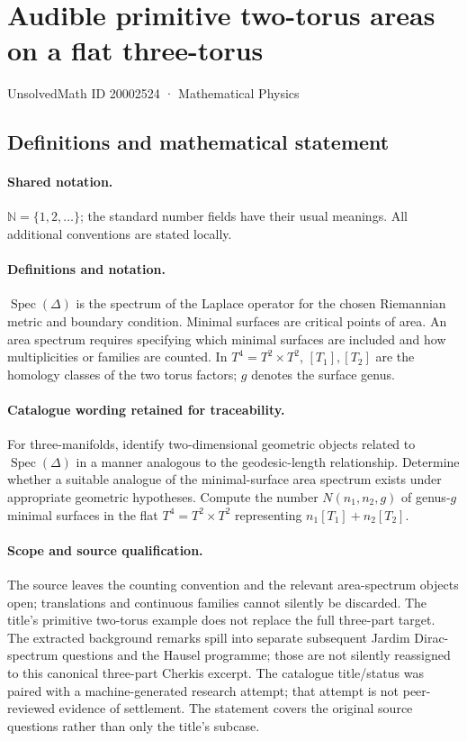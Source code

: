 \documentclass[11pt]{article}
\begin{document}
\setcounter{section}{20002523}
\section{Audible primitive two-torus areas on a flat three-torus}\label{20002524}
{\small UnsolvedMath ID 20002524 · Mathematical Physics}
\subsection{Definitions and mathematical statement}

\paragraph{Shared notation.}$\mathbb N=\{1,2,\ldots\}$; the standard number fields have their usual meanings. All additional conventions are stated locally.


\paragraph{Definitions and notation.}$\operatorname{Spec}(\Delta)$ is the spectrum of the Laplace operator for the chosen Riemannian metric and boundary condition. Minimal surfaces are critical points of area. An area spectrum requires specifying which minimal surfaces are included and how multiplicities or families are counted. In $T^4=T^2\times T^2$, $[T_1],[T_2]$ are the homology classes of the two torus factors; $g$ denotes the surface genus.

\paragraph{Catalogue wording retained for traceability.}
For three-manifolds, identify two-dimensional geometric objects related to $\operatorname{Spec}(\Delta)$ in a manner analogous to the geodesic-length relationship. Determine whether a suitable analogue of the minimal-surface area spectrum exists under appropriate geometric hypotheses. Compute the number $N(n_1,n_2,g)$ of genus-$g$ minimal surfaces in the flat $T^4=T^2\times T^2$ representing $n_1[T_1]+n_2[T_2]$.
\paragraph{Scope and source qualification.}The source leaves the counting convention and the relevant area-spectrum objects open; translations and continuous families cannot silently be discarded. The title’s primitive two-torus example does not replace the full three-part target. The extracted background remarks spill into separate subsequent Jardim Dirac-spectrum questions and the Hausel programme; those are not silently reassigned to this canonical three-part Cherkis excerpt. The catalogue title/status was paired with a machine-generated research attempt; that attempt is not peer-reviewed evidence of settlement. The statement covers the original source questions rather than only the title’s subcase.
\end{document}
